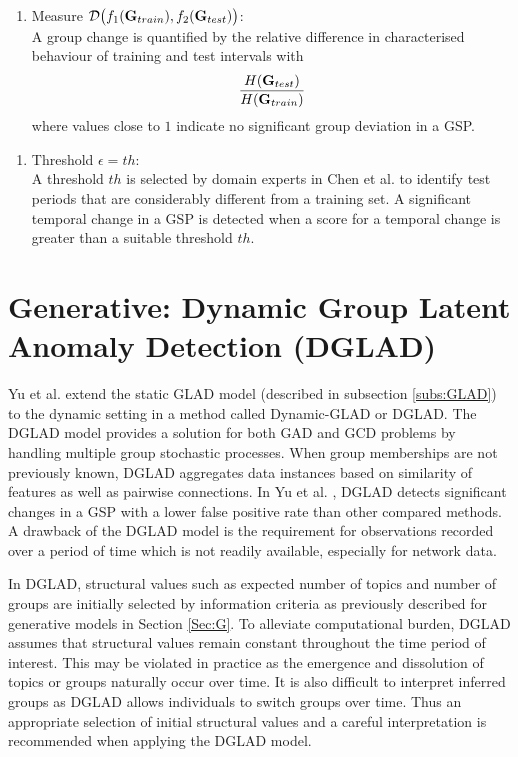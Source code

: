 \begin{enumerate}[3.] 
 \item Measure $ \mathcal{D}\big(f_1 ({\bf G}_{train}) , f_2({\bf G}_{test} )\big )$: \\
 A group change is quantified by the relative difference in characterised behaviour of  training and test intervals  with  
\[ \displaystyle \frac{ H({\bf G}_{test})}{ H({\bf G}_{train}) }   \] 
  where values close to $1$  indicate no significant group deviation  in a GSP.   
\end{enumerate}
\begin{enumerate}[4.]
\item Threshold $\epsilon= th$: \\ 
A threshold  $th$ is selected by domain experts in  Chen et al. \cite{GLETS} to identify test periods that are considerably different from a training set.   A significant temporal change in a GSP is detected when a score for a temporal change is greater than a suitable threshold $th$. 
\end{enumerate}



\section{ Generative: Dynamic Group Latent Anomaly Detection (DGLAD) }
Yu et al. \cite{GLAD} extend the static GLAD model (described in subsection \ref{subs:GLAD}) to the dynamic setting in a method called Dynamic-GLAD or DGLAD. The DGLAD  model provides a solution for both GAD and GCD problems by handling multiple group stochastic processes. When group memberships are not previously known, DGLAD aggregates data instances based on similarity of features as well as pairwise connections.   In Yu et al. \cite{GLAD}, DGLAD detects significant changes in a GSP   with a lower false positive rate than other compared methods.   
 A  drawback of the DGLAD model is the requirement for observations recorded over a period of time which is not readily available, especially for network data. 

In DGLAD, structural values such as expected number of topics and number of groups  are initially selected by information criteria as previously described for  generative models in Section \ref{Sec:G}. To alleviate  computational burden, DGLAD  assumes that structural  values remain constant throughout the time period of interest. This may be violated in practice as the emergence and dissolution of topics or groups naturally occur over time.  It is also difficult to interpret inferred groups  as DGLAD allows individuals to switch groups   over time.  Thus an appropriate selection of initial structural values and a careful interpretation is recommended when applying the DGLAD model.

